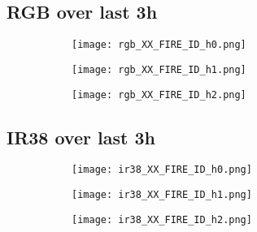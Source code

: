 \subsection*{RGB over last 3h}
\vspace{-1em}
\begin{figure}[H]
    \centering
    \begin{subfigure}[b]{0.32\textwidth}
        \centering
        \texttt{[image: rgb\_XX\_FIRE\_ID\_h0.png]} %
    \end{subfigure}
    \begin{subfigure}[b]{0.32\textwidth}
        \centering
        \texttt{[image: rgb\_XX\_FIRE\_ID\_h1.png]} %
    \end{subfigure}
    \begin{subfigure}[b]{0.32\textwidth}
        \centering
        \texttt{[image: rgb\_XX\_FIRE\_ID\_h2.png]} %
    \end{subfigure}
\end{figure}

\vspace{-1em}
\subsection*{IR38 over last 3h}
\vspace{-1em}
\begin{figure}[H]
    \centering
    \begin{subfigure}[b]{0.32\textwidth}
        \centering
        \texttt{[image: ir38\_XX\_FIRE\_ID\_h0.png]} %
    \end{subfigure}
    \begin{subfigure}[b]{0.32\textwidth}
        \centering
        \texttt{[image: ir38\_XX\_FIRE\_ID\_h1.png]} %
    \end{subfigure}
    \begin{subfigure}[b]{0.32\textwidth}
        \centering
        \texttt{[image: ir38\_XX\_FIRE\_ID\_h2.png]} %
    \end{subfigure}
\end{figure}

